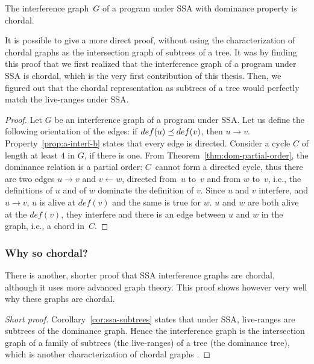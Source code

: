 {\begin{theorem}
  \label{thm:ssa-chordal}
  The interference graph~$G$ of a program under \ac{SSA} with dominance property is chordal.
\end{theorem}


It is possible to give a more direct proof, without using the characterization 
of chordal graphs as the intersection graph of subtrees of a tree. It was by 
finding this proof that we first realized that the interference graph of a 
program under \ac{SSA} is chordal, which is the very first contribution of this 
thesis.  Then, we figured out that the chordal representation as subtrees of a 
tree would perfectly match the live-ranges under \ac{SSA}.

\begin{proof}
  Let $G$ be an interference graph of a program under \ac{SSA}.
  Let us define the following orientation of the 
  edges: if $def(u) \preceq def(v)$, then $u \rightarrow v$.
  Property~\ref{prop:a-interf-b} states that every edge is directed.
%
  Consider a cycle $C$ of length at least $4$ in $G$, if there is one.  From 
  Theorem~\ref{thm:dom-partial-order}, the dominance relation is a partial 
  order: $C$~cannot form a directed cycle, thus there are two edges $u 
  \rightarrow v$ and $v \leftarrow w$, directed from~$u$ to~$v$ and from $w$ 
  to~$v$, i.e., the definitions of $u$ and of $w$ dominate the definition of 
  $v$.
%
  Since $u$ and $v$ interfere, and $u\rightarrow v$, $u$ is alive at $def(v)$ 
  and the same is true for $w$. $u$ and $w$ are both alive at the $def(v)$,
  they interfere and there is an edge between $u$ and $w$ in the graph, i.e., a 
  chord in~$C$.

\end{proof}


\subsubsection{Why so chordal?}

There is another, shorter proof that SSA interference graphs are chordal, 
although it uses more advanced graph theory. This proof shows however very well 
why these graphs are chordal.

\begin{proof}[Short proof]
  Corollary~\ref{cor:ssa-subtrees} states that under \ac{SSA}, live-ranges 
  are subtrees of the dominance graph. Hence the interference graph is the 
  intersection graph of a family of subtrees (the live-ranges) of a tree (the 
  dominance tree), which is another characterization of chordal graphs 
  \cite[Thm.~4.8]{Golumbic}.
\end{proof}



}
